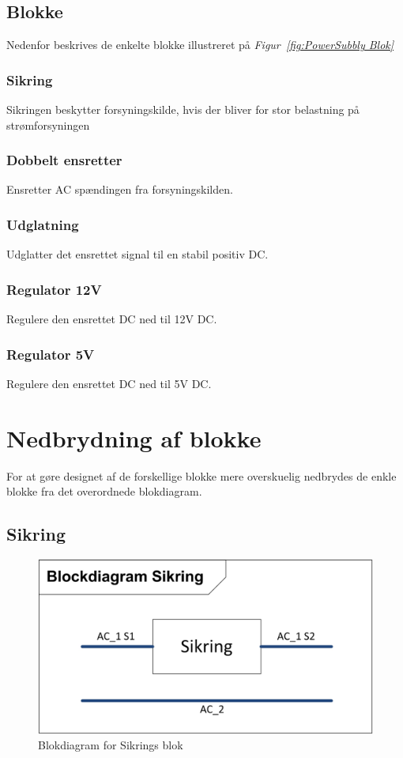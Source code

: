 \subsection{Blokke}
Nedenfor beskrives de enkelte blokke illustreret på \textit{Figur~\ref{fig:PowerSubbly Blok}}
\subsubsection{Sikring}
Sikringen beskytter forsyningskilde, hvis der bliver for stor belastning på strømforsyningen
\subsubsection{Dobbelt ensretter}
Ensretter AC spændingen fra forsyningskilden.
\subsubsection{Udglatning}
Udglatter det ensrettet signal til en stabil positiv DC. 
\subsubsection{Regulator 12V}
Regulere den ensrettet DC ned til 12V DC.
\subsubsection{Regulator 5V}
Regulere den ensrettet DC ned til 5V DC.
\newpage
\section{Nedbrydning af blokke}
For at gøre designet af de forskellige blokke mere overskuelig nedbrydes de enkle blokke fra det overordnede blokdiagram.
\subsection{Sikring}
\begin{figure}[H]
\centering
\includegraphics[scale=1]{billeder/SikringsBlok}
\caption{Blokdiagram for Sikrings blok}
\label{fig:SikringsBlok}
\end{figure}
